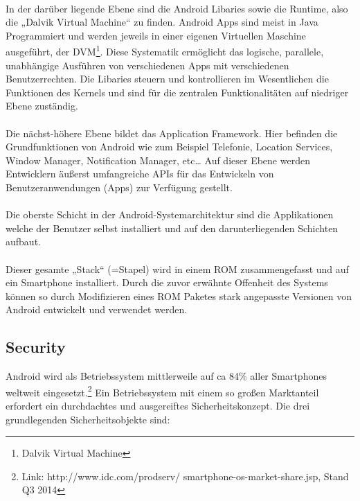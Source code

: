 \paragraph*{}
In der darüber liegende Ebene sind die Android Libaries sowie die Runtime, also die „Dalvik Virtual Machine“ zu finden. \newline
Android Apps sind meist in Java Programmiert und werden jeweils in einer eigenen Virtuellen Maschine ausgeführt, der DVM\footnote{Dalvik Virtual Machine}. Diese Systematik ermöglicht das logische, parallele, unabhängige Ausführen von verschiedenen Apps mit verschiedenen Benutzerrechten.
Die Libaries steuern und kontrollieren im Wesentlichen die Funktionen des Kernels und sind für die zentralen Funktionalitäten auf niedriger Ebene zuständig.
\paragraph*{}
Die nächst-höhere Ebene bildet das Application Framework. Hier befinden die Grundfunktionen von Android wie zum Beispiel Telefonie, Location Services, Window Manager, Notification Manager, etc… 
Auf dieser Ebene werden Entwicklern äußerst umfangreiche APIs für das Entwickeln von Benutzeranwendungen (Apps) zur Verfügung gestellt.
\paragraph*{}
Die oberste Schicht in der Android-Systemarchitektur sind die Applikationen welche der Benutzer selbst installiert und auf den darunterliegenden Schichten aufbaut.
\paragraph*{}
Dieser gesamte „Stack“ (=Stapel) wird in einem ROM zusammengefasst und auf ein Smartphone installiert. Durch die zuvor erwähnte Offenheit des Systems können so durch Modifizieren eines ROM Paketes stark angepasste Versionen von Android entwickelt und verwendet werden.


\subsection{Security}
Android wird als Betriebssystem mittlerweile auf ca 84\% aller Smartphones weltweit eingesetzt.\footnote{Link: http://www.idc.com/prodserv/									smartphone-os-market-share.jsp, Stand Q3 2014} Ein Betriebssystem mit einem so großen Marktanteil erfordert ein durchdachtes und ausgereiftes Sicherheitskonzept.
Die drei grundlegenden Sicherheitsobjekte sind:

